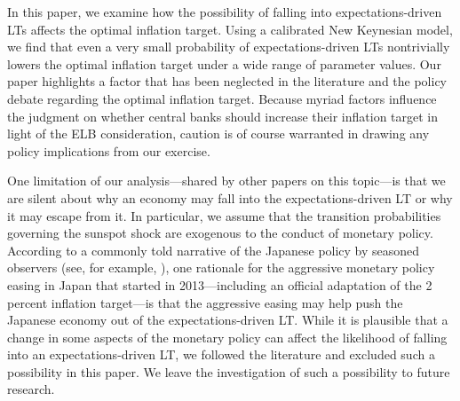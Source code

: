 \documentclass[11pt]{article}
\begin{document}
	In this paper, we examine how the possibility of falling into expectations-driven LTs affects the optimal inflation target. Using a calibrated New Keynesian model, we find that even a very small probability of expectations-driven LTs nontrivially lowers the optimal inflation target under a wide range of parameter values. Our paper highlights a factor that has been neglected in the literature and the policy debate regarding the optimal inflation target. Because myriad factors influence the judgment on whether central banks should increase their inflation target in light of the ELB consideration, caution is of course warranted in drawing any policy implications from our exercise.
	
	One limitation of our analysis---shared by other papers on this topic---is that we are silent about why an economy may fall into the expectations-driven LT or why it may escape from it. In particular, we assume that the transition probabilities governing the sunspot shock are exogenous to the conduct of monetary policy. According to a commonly told narrative of the Japanese policy by seasoned observers (see, for example, \citet{Hayakawa2016Book}), one rationale for the aggressive monetary policy easing in Japan that started in 2013---including an official adaptation of the 2 percent inflation target---is that the aggressive easing may help push the Japanese economy out of the expectations-driven LT. While it is plausible that a change in some aspects of the monetary policy can affect the likelihood of falling into an expectations-driven LT, we followed the literature and excluded such a possibility in this paper. We leave the investigation of such a possibility to future research.
	
	
	\newpage
	
	
	
\end{document}
